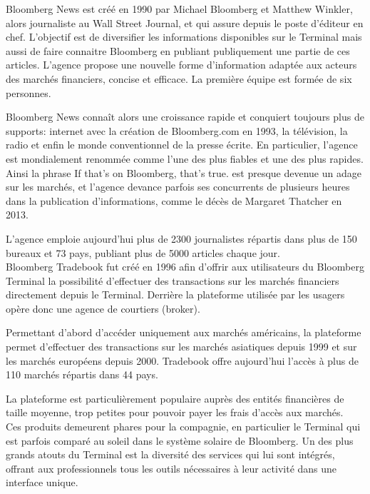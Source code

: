 \documentclass[11pt, oneside, titlepage, a4paper]{article}
\begin{document}
Bloomberg News est créé en 1990 par Michael Bloomberg et Matthew Winkler, alors journaliste au Wall Street Journal, et qui assure depuis le poste d'éditeur en chef. L'objectif est de diversifier les informations disponibles sur le Terminal mais aussi de faire connaitre Bloomberg en publiant publiquement une partie de ces articles. L'agence propose une nouvelle forme d'information adaptée aux acteurs des marchés financiers, concise et efficace. La première équipe est formée de six personnes.

Bloomberg News connaît alors une croissance rapide et conquiert toujours plus de supports: internet avec la création de Bloomberg.com en 1993, la télévision, la radio et enfin le monde conventionnel de la presse écrite. En particulier, l'agence est mondialement renommée comme l'une des plus fiables et une des plus rapides. Ainsi la phrase \og If that's on Bloomberg, that's true.\fg{} est presque devenue un adage sur les marchés, et l'agence devance parfois ses concurrents de plusieurs heures dans la publication d'informations, comme le décès de Margaret Thatcher en 2013.

L'agence emploie aujourd'hui plus de 2300 journalistes répartis dans plus de 150 bureaux et 73 pays, publiant plus de 5000 articles chaque jour.
\\

Bloomberg Tradebook fut créé en 1996 afin d'offrir aux utilisateurs du Bloomberg Terminal la possibilité d'effectuer des transactions sur les marchés financiers directement depuis le Terminal. Derrière la plateforme utilisée par les usagers opère donc une agence de courtiers (broker).

Permettant d'abord d'accéder uniquement aux marchés américains, la plateforme permet d'effectuer des transactions sur les marchés asiatiques depuis 1999 et sur les marchés européens depuis 2000. Tradebook offre aujourd'hui l'accès à plus de 110 marchés répartis dans 44 pays.

La plateforme est particulièrement populaire auprès des entités financières de taille moyenne, trop petites pour pouvoir payer les frais d'accès aux marchés.
\\

Ces produits demeurent phares pour la compagnie, en particulier le Terminal qui est parfois comparé au soleil dans le système solaire de Bloomberg. Un des plus grands atouts du Terminal est la diversité des services qui lui sont intégrés, offrant aux professionnels tous les outils nécessaires à leur activité dans une interface unique.
\end{document}
